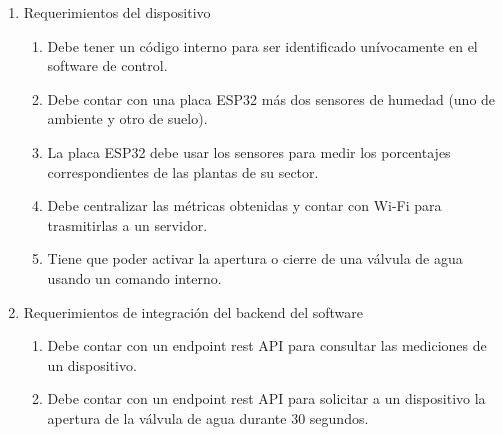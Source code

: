 \documentclass[
11pt, %
codirector, %
]{charter}
\begin{document}
\begin{enumerate}
	\item Requerimientos del dispositivo
		\begin{enumerate}
			\item Debe tener un código interno para ser identificado unívocamente en el software de control.
			\item Debe contar con una placa ESP32 más dos sensores de humedad (uno de ambiente y otro de suelo).
			\item La placa ESP32 debe usar los sensores para medir los porcentajes correspondientes de las plantas de su sector. 
			\item Debe centralizar las métricas obtenidas y contar con Wi-Fi para trasmitirlas a un servidor. 
			\item Tiene que poder activar la apertura o cierre de una válvula de agua usando un comando interno.
		\end{enumerate}
	
	\item Requerimientos de integración del backend del software
		\begin{enumerate}
			\item Debe contar con un endpoint rest API para consultar las mediciones de un dispositivo.
			\item Debe contar con un endpoint rest API para solicitar a un dispositivo la apertura de la válvula de agua durante 30 segundos.
			\end{enumerate}


\end{enumerate}
\end{document}
